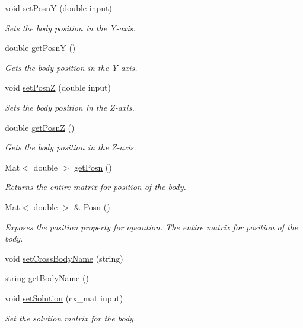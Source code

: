 \begin{DoxyCompactItemize}
void \hyperlink{class_body_a782d1cf6280cebe6857a1aef764d2572}{set\-Posn\-Y} (double input)
\begin{DoxyCompactList}\small\item\em Sets the body position in the Y-\/axis. \end{DoxyCompactList}\item 
double \hyperlink{class_body_ad4b9a74035b9fcb1af31d2ce300911c4}{get\-Posn\-Y} ()
\begin{DoxyCompactList}\small\item\em Gets the body position in the Y-\/axis. \end{DoxyCompactList}\item 
void \hyperlink{class_body_a36a7e543c0bdad30bb16eda563543ac4}{set\-Posn\-Z} (double input)
\begin{DoxyCompactList}\small\item\em Sets the body position in the Z-\/axis. \end{DoxyCompactList}\item 
double \hyperlink{class_body_aaeddfd614683a8bc7fe81383667314a9}{get\-Posn\-Z} ()
\begin{DoxyCompactList}\small\item\em Gets the body position in the Z-\/axis. \end{DoxyCompactList}\item 
Mat$<$ double $>$ \hyperlink{class_body_a09987e449c77ba11fb66cf81de88220a}{get\-Posn} ()
\begin{DoxyCompactList}\small\item\em Returns the entire matrix for position of the body. \end{DoxyCompactList}\item 
Mat$<$ double $>$ \& \hyperlink{class_body_ab78f6612c15b27617175bb385a051667}{Posn} ()
\begin{DoxyCompactList}\small\item\em Exposes the position property for operation. The entire matrix for position of the body. \end{DoxyCompactList}\item 
void \hyperlink{class_body_a38933b2aec94873355dcecc8f8b41db2}{set\-Cross\-Body\-Name} (string)
\item 
string \hyperlink{class_body_aab63febbe35984d8551a188b40ee3c3f}{get\-Body\-Name} ()
\item 
void \hyperlink{class_body_ac1534f2032bc04ff9c118f5f47f3ef8e}{set\-Solution} (cx\-\_\-mat input)
\begin{DoxyCompactList}\small\item\em Set the solution matrix for the body. \end{DoxyCompactList}\item 

\end{DoxyCompactItemize}
